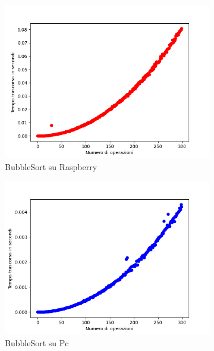 \documentclass{article}
\begin{document}
			\begin{figure}[h!]
				\centering
				
				\begin{subfigure}{0.6\textwidth}
					\centering
					\includegraphics[width = \textwidth]{./Plots/Raspberry_BubbleSort.png}
					\caption{BubbleSort su Raspberry}
				\end{subfigure}
				\begin{subfigure}{0.6\textwidth}
					\centering
					\includegraphics[width = \textwidth]{./Plots/Pc_BubbleSort.png}
					\caption{BubbleSort su Pc}
				\end{subfigure}
				\begin{subfigure}{0.6\textwidth}
					\centering

\end{subfigure}
\end{figure}
\end{document}
